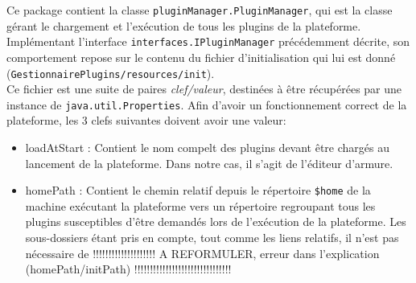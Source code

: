 \documentclass[a4paper]{report}
\begin{document}
Ce package contient la classe \texttt{pluginManager.PluginManager}, qui est la classe gérant le chargement et l'exécution de tous les plugins de la plateforme. Implémentant l'interface \texttt{interfaces.IPluginManager} précédemment décrite, son comportement repose sur le contenu du fichier d'initialisation qui lui est donné (\texttt{GestionnairePlugins/resources/init}).\\

Ce fichier est une suite de paires \textit{clef/valeur}, destinées à être récupérées par une instance de \texttt{java.util.Properties}. Afin d'avoir un fonctionnement correct de la plateforme, les 3 clefs suivantes doivent avoir une valeur:\\

\begin{itemize}
	\item loadAtStart : Contient le nom compelt des plugins devant être chargés au lancement de la plateforme. Dans notre cas, il s'agit de l'éditeur d'armure.
	\item homePath : Contient le chemin relatif depuis le répertoire \texttt{\$home} de la machine exécutant la plateforme vers un répertoire regroupant tous les plugins susceptibles d'être demandés lors de l'exécution de la plateforme. Les sous-dossiers étant pris en compte, tout comme les liens relatifs, il n'est pas nécessaire de 
	!!!!!!!!!!!!!!!!!!!! A REFORMULER, erreur dans l'explication (homePath/initPath) !!!!!!!!!!!!!!!!!!!!!!!!!!!!!!!
\end{itemize}
\end{document}
